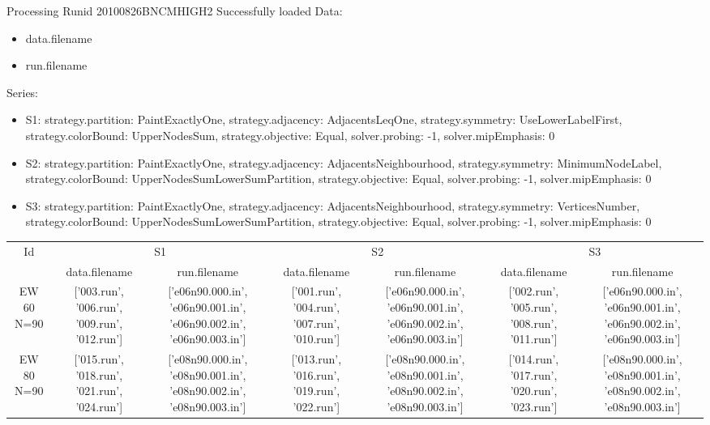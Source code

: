 \documentclass[landscape, 12pt]{report}
\begin{document}
	Processing Runid 20100826BNCMHIGH2
 Successfully loaded
Data:
\begin{itemize}
\item data.filename
\item run.filename
\end{itemize}
Series:
\begin{itemize}
\item S1: strategy.partition: PaintExactlyOne, strategy.adjacency: AdjacentsLeqOne, strategy.symmetry: UseLowerLabelFirst, strategy.colorBound: UpperNodesSum, strategy.objective: Equal, solver.probing: -1, solver.mipEmphasis: 0
\item S2: strategy.partition: PaintExactlyOne, strategy.adjacency: AdjacentsNeighbourhood, strategy.symmetry: MinimumNodeLabel, strategy.colorBound: UpperNodesSumLowerSumPartition, strategy.objective: Equal, solver.probing: -1, solver.mipEmphasis: 0
\item S3: strategy.partition: PaintExactlyOne, strategy.adjacency: AdjacentsNeighbourhood, strategy.symmetry: VerticesNumber, strategy.colorBound: UpperNodesSumLowerSumPartition, strategy.objective: Equal, solver.probing: -1, solver.mipEmphasis: 0
\end{itemize}
\begin{tabular}{|c|cc|cc|cc|}
\hline
\multicolumn{1}{|c|}{Id} & \multicolumn{2}{|c|}{S1} & \multicolumn{2}{|c|}{S2} & \multicolumn{2}{|c|}{S3}
\\
 & data.filename & run.filename & data.filename & run.filename & data.filename & run.filename
\\
\hline
EW 60 N=90 & ['003.run', '006.run', '009.run', '012.run'] & ['e06n90.000.in', 'e06n90.001.in', 'e06n90.002.in', 'e06n90.003.in'] & ['001.run', '004.run', '007.run', '010.run'] & ['e06n90.000.in', 'e06n90.001.in', 'e06n90.002.in', 'e06n90.003.in'] & ['002.run', '005.run', '008.run', '011.run'] & ['e06n90.000.in', 'e06n90.001.in', 'e06n90.002.in', 'e06n90.003.in']
\\
EW 80 N=90 & ['015.run', '018.run', '021.run', '024.run'] & ['e08n90.000.in', 'e08n90.001.in', 'e08n90.002.in', 'e08n90.003.in'] & ['013.run', '016.run', '019.run', '022.run'] & ['e08n90.000.in', 'e08n90.001.in', 'e08n90.002.in', 'e08n90.003.in'] & ['014.run', '017.run', '020.run', '023.run'] & ['e08n90.000.in', 'e08n90.001.in', 'e08n90.002.in', 'e08n90.003.in']
\\
\hline 
 \end{tabular}

 
 
 
 
\end{document}
